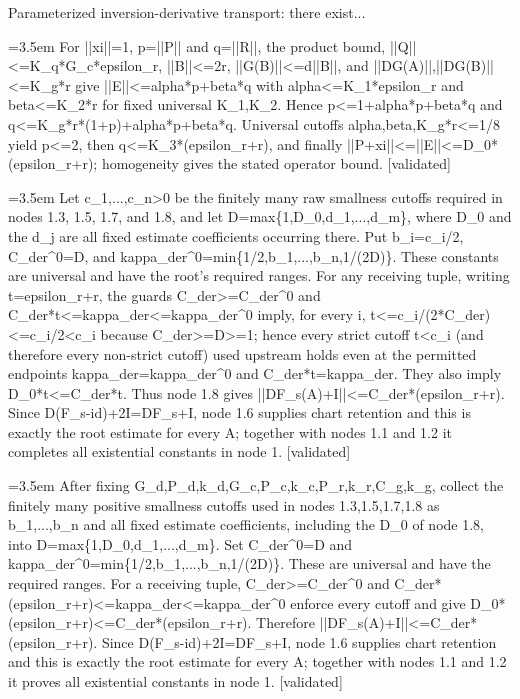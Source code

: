 \documentclass{article}
\newcommand{\step}[1]{\par\noindent\hangindent=3.5em\hangafter=1%
  \makebox[3.5em][l]{\textbf{#1.}}}
\newcommand{\steptag}[1]{\hfill{\small\textsf{[#1]}}}
\begin{document}
\begin{proofbox}{Parameterized inversion-derivative transport: there exist...}
\step{1.8.2} For ||xi||=1, p=||P|| and q=||R||, the product bound, ||Q||<=K\_q*G\_c*epsilon\_r, ||B||<=2r, ||G(B)||<=d||B||, and ||DG(A)||,||DG(B)||<=K\_g*r give ||E||<=alpha*p+beta*q with alpha<=K\_1*epsilon\_r and beta<=K\_2*r for fixed universal K\_1,K\_2. Hence p<=1+alpha*p+beta*q and q<=K\_g*r*(1+p)+alpha*p+beta*q. Universal cutoffs alpha,beta,K\_g*r<=1/8 yield p<=2, then q<=K\_3*(epsilon\_r+r), and finally ||P+xi||<=||E||<=D\_0*(epsilon\_r+r); homogeneity gives the stated operator bound. \steptag{validated} \\[4pt]
\step{1.9} Let c\_1,...,c\_n>0 be the finitely many raw smallness cutoffs required in nodes 1.3, 1.5, 1.7, and 1.8, and let D=max\{1,D\_0,d\_1,...,d\_m\}, where D\_0 and the d\_j are all fixed estimate coefficients occurring there. Put b\_i=c\_i/2, C\_der\textasciicircum{}0=D, and kappa\_der\textasciicircum{}0=min\{1/2,b\_1,...,b\_n,1/(2D)\}. These constants are universal and have the root's required ranges. For any receiving tuple, writing t=epsilon\_r+r, the guards C\_der>=C\_der\textasciicircum{}0 and C\_der*t<=kappa\_der<=kappa\_der\textasciicircum{}0 imply, for every i, t<=c\_i/(2*C\_der)<=c\_i/2<c\_i because C\_der>=D>=1; hence every strict cutoff t<c\_i (and therefore every non-strict cutoff) used upstream holds even at the permitted endpoints kappa\_der=kappa\_der\textasciicircum{}0 and C\_der*t=kappa\_der. They also imply D\_0*t<=C\_der*t. Thus node 1.8 gives ||DF\_s(A)+I||<=C\_der*(epsilon\_r+r). Since D(F\_s-id)+2I=DF\_s+I, node 1.6 supplies chart retention and this is exactly the root estimate for every A; together with nodes 1.1 and 1.2 it completes all existential constants in node 1. \steptag{validated} \\[6pt]
\step{1.9.1} After fixing G\_d,P\_d,k\_d,G\_c,P\_c,k\_c,P\_r,k\_r,C\_g,k\_g, collect the finitely many positive smallness cutoffs used in nodes 1.3,1.5,1.7,1.8 as b\_1,...,b\_n and all fixed estimate coefficients, including the D\_0 of node 1.8, into D=max\{1,D\_0,d\_1,...,d\_m\}. Set C\_der\textasciicircum{}0=D and kappa\_der\textasciicircum{}0=min\{1/2,b\_1,...,b\_n,1/(2D)\}. These are universal and have the required ranges. For a receiving tuple, C\_der>=C\_der\textasciicircum{}0 and C\_der*(epsilon\_r+r)<=kappa\_der<=kappa\_der\textasciicircum{}0 enforce every cutoff and give D\_0*(epsilon\_r+r)<=C\_der*(epsilon\_r+r). Therefore ||DF\_s(A)+I||<=C\_der*(epsilon\_r+r). Since D(F\_s-id)+2I=DF\_s+I, node 1.6 supplies chart retention and this is exactly the root estimate for every A; together with nodes 1.1 and 1.2 it proves all existential constants in node 1. \steptag{validated} \\[4pt]
\end{proofbox}
\end{document}

